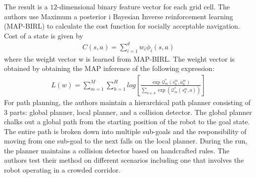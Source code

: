 The result is a $12$-dimensional binary feature vector for each grid cell.
The authors use Maximum a posterior i Bayesian Inverse reinforcement learning (MAP-BIRL) \cite{choi_MAP-BIRL_2011} to calculate the cost function for socially acceptable navigation. Cost of a state is given by
\begin{align}
C(s,a) = \sum^{d}_{i=1} w_i \phi_i(s,a)
\end{align}
where the weight vector w is learned from MAP-BIRL. 
The weight vector is obtained by obtaining the MAP inference of the following expression:
\begin{align}
L(w) = \sum^M_{m=1} \sum^{H}_{h=1}log[\frac{\exp \mathcal{Q}^{*}_m(s^m_h, a^m_h)}{\sum_{a\in A} \exp(\mathcal{Q}_m^*(s_h^m,a))}]
\end{align}
For path planning, the authors maintain a hierarchical path planner consisting of 3 parts: global planner, local planner, and a collision detector.
The global planner chalks out a global path from the starting position of the robot to the goal state. The entire path is broken down into multiple sub-goals and the responsibility of moving from one sub-goal to the next falls on the local planner. During the run, the planner maintains a collision detector based on handcrafted rules.
The authors test their method on different scenarios including one that involves the robot operating in a crowded corridor.\\

